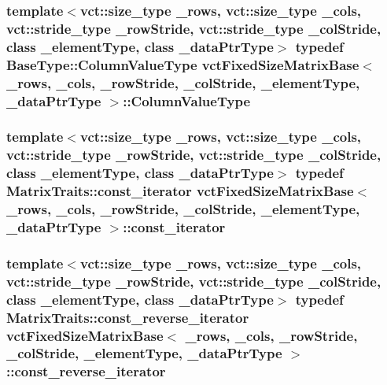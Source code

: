 \hypertarget{classvct_fixed_size_matrix_base_a7420316140dde042d228bc02fb98d4a7}{
\subsubsection[{Column\-Value\-Type}]{\setlength{\rightskip}{0pt plus 5cm}template$<$vct\-::size\-\_\-type \-\_\-rows, vct\-::size\-\_\-type \-\_\-cols, vct\-::stride\-\_\-type \-\_\-row\-Stride, vct\-::stride\-\_\-type \-\_\-col\-Stride, class \-\_\-element\-Type, class \-\_\-data\-Ptr\-Type$>$ typedef {\bf Base\-Type\-::\-Column\-Value\-Type} {\bf vct\-Fixed\-Size\-Matrix\-Base}$<$ \-\_\-rows, \-\_\-cols, \-\_\-row\-Stride, \-\_\-col\-Stride, \-\_\-element\-Type, \-\_\-data\-Ptr\-Type $>$\-::{\bf Column\-Value\-Type}}}\label{classvct_fixed_size_matrix_base_a7420316140dde042d228bc02fb98d4a7}
\hypertarget{classvct_fixed_size_matrix_base_a53dcfd245b0c11371d50c406fa59db61}{
\subsubsection[{const\-\_\-iterator}]{\setlength{\rightskip}{0pt plus 5cm}template$<$vct\-::size\-\_\-type \-\_\-rows, vct\-::size\-\_\-type \-\_\-cols, vct\-::stride\-\_\-type \-\_\-row\-Stride, vct\-::stride\-\_\-type \-\_\-col\-Stride, class \-\_\-element\-Type, class \-\_\-data\-Ptr\-Type$>$ typedef {\bf Matrix\-Traits\-::const\-\_\-iterator} {\bf vct\-Fixed\-Size\-Matrix\-Base}$<$ \-\_\-rows, \-\_\-cols, \-\_\-row\-Stride, \-\_\-col\-Stride, \-\_\-element\-Type, \-\_\-data\-Ptr\-Type $>$\-::{\bf const\-\_\-iterator}}}\label{classvct_fixed_size_matrix_base_a53dcfd245b0c11371d50c406fa59db61}
\hypertarget{classvct_fixed_size_matrix_base_a82f39f6102bda23fe977efe94ebf06dd}{
\subsubsection[{const\-\_\-reverse\-\_\-iterator}]{\setlength{\rightskip}{0pt plus 5cm}template$<$vct\-::size\-\_\-type \-\_\-rows, vct\-::size\-\_\-type \-\_\-cols, vct\-::stride\-\_\-type \-\_\-row\-Stride, vct\-::stride\-\_\-type \-\_\-col\-Stride, class \-\_\-element\-Type, class \-\_\-data\-Ptr\-Type$>$ typedef {\bf Matrix\-Traits\-::const\-\_\-reverse\-\_\-iterator} {\bf vct\-Fixed\-Size\-Matrix\-Base}$<$ \-\_\-rows, \-\_\-cols, \-\_\-row\-Stride, \-\_\-col\-Stride, \-\_\-element\-Type, \-\_\-data\-Ptr\-Type $>$\-::{\bf const\-\_\-reverse\-\_\-iterator}}}\label{classvct_fixed_size_matrix_base_a82f39f6102bda23fe977efe94ebf06dd}
